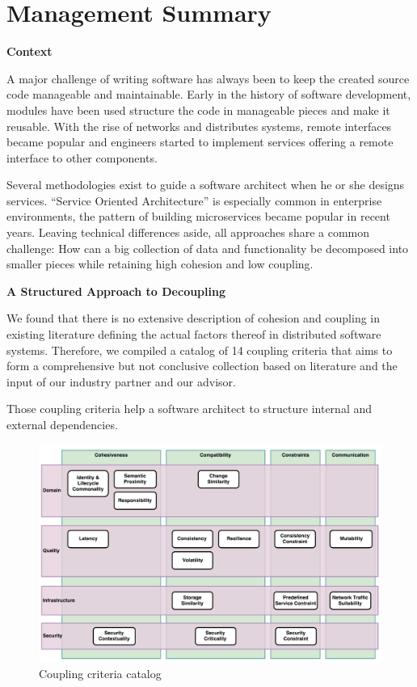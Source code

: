 \chapter{Management Summary}


\textbf{Context}

A major challenge of writing software has always been to keep the created source code manageable and maintainable. Early in the history of software development, modules have been used structure the code in manageable pieces and make it reusable. With the rise of networks and distributes systems, remote interfaces became popular and engineers started to implement services offering a remote interface to other components.

Several methodologies exist to guide a software architect when he or she designs services. \enquote{Service Oriented Architecture} is especially common in enterprise environments, the pattern of building microservices became popular in recent years. Leaving technical differences aside, all approaches share a common challenge: How can a big collection of data and functionality be decomposed into smaller pieces while retaining high cohesion and low coupling.

\textbf{A Structured Approach to Decoupling}

We found that there is no extensive description of cohesion and coupling in existing literature defining the actual factors thereof in distributed software systems. Therefore, we compiled a catalog of 14 coupling criteria that aims to form a comprehensive but not conclusive collection based on literature and the input of our industry partner and our advisor. 

Those coupling criteria help a software architect to structure internal and external dependencies. 

\begin{figure}[H]
	\centerline{\includegraphics[scale=0.5]{diagrams/CouplingCatalog.pdf}}
	\caption{Coupling criteria catalog}
	\label{fig:cc-catalog-mgmt-summary}
\end{figure}

